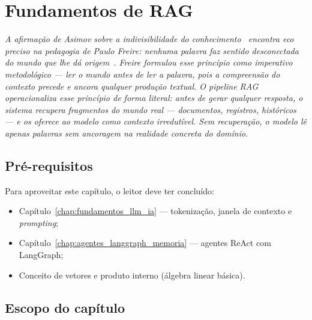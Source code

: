 \chapter{Fundamentos de RAG}
\label{chap:rag_fundamentos}

{\small\itshape\color{AccentGray}
A afirma\c{c}\~{a}o de Asimov sobre a indivisibilidade do conhecimento~\cite{asimov1983rovingmind} encontra eco preciso na pedagogia de Paulo Freire: nenhuma palavra faz sentido desconectada do mundo que lhe d\'{a} origem~\cite{freire1968pedagogia}. Freire formulou esse princ\'{i}pio como imperativo metodol\'{o}gico --- ler o mundo antes de ler a palavra, pois a compreens\~{a}o do contexto precede e ancora qualquer produ\c{c}\~{a}o textual. O pipeline RAG operacionaliza esse princ\'{i}pio de forma literal: antes de gerar qualquer resposta, o sistema recupera fragmentos do mundo real --- documentos, registros, hist\'{o}ricos --- e os oferece ao modelo como contexto irredut\'{i}vel. Sem recupera\c{c}\~{a}o, o modelo l\^{e} apenas palavras sem ancoragem na realidade concreta do dom\'{i}nio.\par}
\vspace{0.6em}
\section{Pr\'e-requisitos}

Para aproveitar este cap\'itulo, o leitor deve ter conclu\'ido:

\begin{itemize}[leftmargin=*]
  \item Cap\'itulo~\ref{chap:fundamentos_llm_ia} --- tokeniza\c{c}\~ao,
        janela de contexto e \textit{prompting};
  \item Cap\'itulo~\ref{chap:agentes_langgraph_memoria} --- agentes
        ReAct com LangGraph;
  \item Conceito de vetores e produto interno (\'algebra linear b\'asica).
\end{itemize}

\section{Escopo do cap\'itulo}

